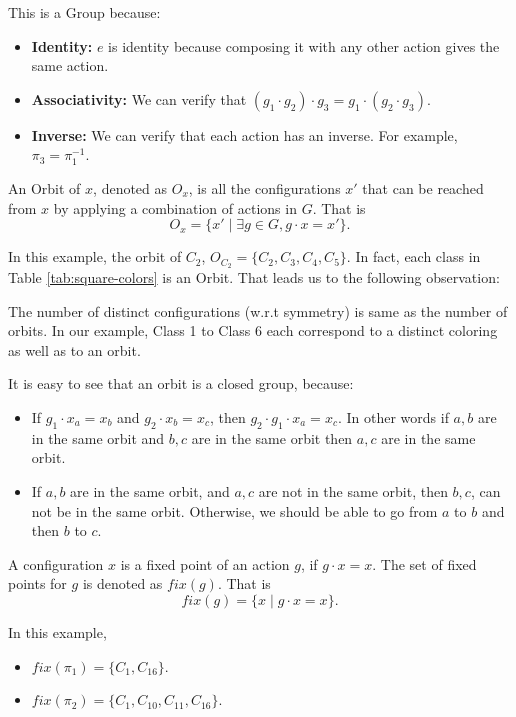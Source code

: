 \documentclass[11pt,twoside]{scrartcl}
\begin{document}
This is a Group because:
\begin{itemize} 
    \item \textbf{Identity: } $e$ is identity because composing it with any other action gives the same action.
    \item \textbf{Associativity: } We can verify that $(g_1 \cdot g_2) \cdot g_3 = g_1 \cdot (g_2 \cdot g_3)$.
    \item \textbf{Inverse: } We can verify that each action has an inverse. For example, $\pi_3 = \pi_1^{-1}$.
\end{itemize}

\begin{definition}[Orbit]
    An Orbit of $x$, denoted as $O_x$, is all the configurations $x'$ that can be reached from $x$ by applying a combination of actions in $G$. That is
    \[O_x = \{x' \mid \exists g \in G, g \cdot x = x' \}. \]
\end{definition}
In this example, the orbit of $C_2$, $O_{C_2} = \{C_2, C_3, C_4, C_5\}.$ In fact, each class in Table \ref{tab:square-colors} is an Orbit. That leads us to the following observation:
\begin{remark}
    The number of distinct configurations (w.r.t symmetry) is same as the number of orbits. In our example, Class 1 to Class 6 each correspond to a distinct coloring as well as to an orbit.
\end{remark}

It is easy to see that an orbit is a closed group, because:
\begin{itemize}
    \item If $g_1 \cdot x_a = x_b$ and $g_2 \cdot x_b = x_c$, then $g_2 \cdot g_1 \cdot x_a = x_c$. In other words if $a, b$ are in the same orbit and $b, c$ are in the same orbit then $a, c$ are in the same orbit.
    \item If $a, b$ are in the same orbit, and $a, c$ are not in the same orbit, then $b, c$, can not be in the same orbit. Otherwise, we should be able to go from $a$ to $b$ and then $b$ to $c$.
\end{itemize}

\begin{definition}
    A configuration $x$ is a fixed point of an action $g$, if $g \cdot x = x$. The set of fixed points for $g$ is denoted as $fix(g)$. That is 
    \[fix(g) = \{x \mid g\cdot x = x\}. \]
\end{definition}

In this example,
\begin{itemize}
    \item $fix(\pi_1) = \{C_1, C_{16}\}$.
    \item $fix(\pi_2) = \{C_1, C_{10}, C_{11}, C_{16}\}$. 
\end{itemize}
\end{document}
